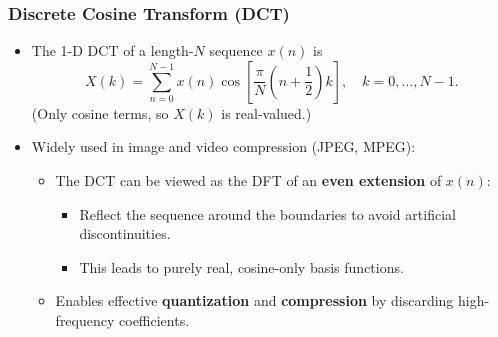 \begin{frame}
	\frametitle{Discrete Cosine Transform (DCT)}
	\begin{itemize}
		\item The 1-D DCT of a length-$N$ sequence $x(n)$ is
		\begin{equation}
			X(k) = \sum_{n=0}^{N-1} x(n)\cos\left[\frac{\pi}{N}\left(n + \frac{1}{2}\right)k\right],
			\quad k = 0,\ldots,N-1.
		\end{equation}
		(Only cosine terms, so $X(k)$ is real-valued.)
		\item Widely used in image and video compression (JPEG, MPEG):
		\begin{itemize}
			\item The DCT can be viewed as the DFT of an \textbf{even extension} of $x(n)$:
			\begin{itemize}
				\item Reflect the sequence around the boundaries to avoid artificial discontinuities.
				\item This leads to purely real, cosine-only basis functions.
			\end{itemize}
			\item Enables effective \textbf{quantization} and \textbf{compression} by discarding high-frequency coefficients.
		\end{itemize}
	\end{itemize}
\end{frame}

